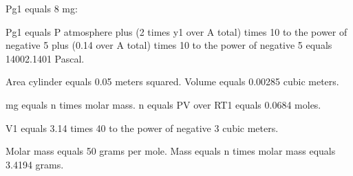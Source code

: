 Pg1 equals 8 mg:

Pg1 equals P atmosphere plus (2 times y1 over A total) times 10 to the power of negative 5 plus (0.14 over A total) times 10 to the power of negative 5 equals 14002.1401 Pascal.

Area cylinder equals 0.05 meters squared. Volume equals 0.00285 cubic meters.

mg equals n times molar mass. n equals PV over RT1 equals 0.0684 moles.

V1 equals 3.14 times 40 to the power of negative 3 cubic meters.

Molar mass equals 50 grams per mole. Mass equals n times molar mass equals 3.4194 grams.